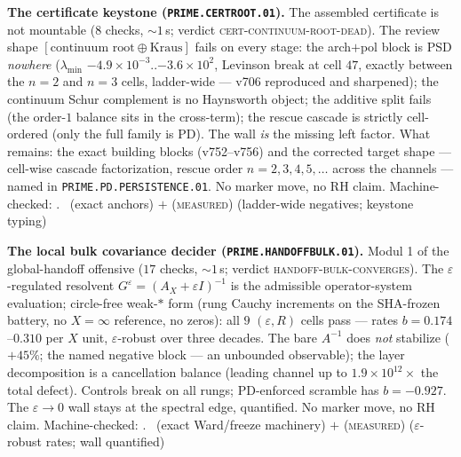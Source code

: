 \par\smallskip\noindent\textbf{The certificate keystone
(\texttt{PRIME.CERTROOT.01}).}
The assembled certificate is not mountable ($8$ checks,
${\sim}1$\,s; verdict \textsc{cert-continuum-root-dead}).  The
review shape $[\text{continuum root}\oplus\text{Kraus}]$ fails on
every stage: the arch$+$pol block is PSD \emph{nowhere}
($\lambda_{\min}$ $-4.9\times10^{-3}$..$-3.6\times10^{2}$,
Levinson break at cell $47$, exactly between the $n=2$ and $n=3$
cells, ladder-wide --- v706 reproduced and sharpened); the
continuum Schur complement is no Haynsworth object; the additive
split fails (the order-$1$ balance sits in the cross-term); the
rescue cascade is strictly cell-ordered (only the full family is
PD).  The wall \emph{is} the missing left factor.  What remains:
the exact building blocks (v752--v756) and the corrected target
shape --- cell-wise cascade factorization, rescue order
$n=2,3,4,5,\dots$ across the channels --- named in
\texttt{PRIME.PD.PERSISTENCE.01}.  No marker move, no RH claim.
Machine-checked: .
\mE\ (exact anchors) $+$ (\textsc{measured}) (ladder-wide
negatives; keystone typing)
\par\smallskip


\par\smallskip\noindent\textbf{The local bulk covariance decider
(\texttt{PRIME.HANDOFFBULK.01}).}
Modul 1 of the global-handoff offensive ($17$ checks, ${\sim}1$\,s;
verdict \textsc{handoff-bulk-converges}).  The
$\varepsilon$-regulated resolvent
$G^\varepsilon=(A_X+\varepsilon I)^{-1}$ is the admissible
operator-system evaluation; circle-free weak-$*$ form (rung Cauchy
increments on the SHA-frozen battery, no $X{=}\infty$ reference, no
zeros): all $9$ $(\varepsilon,R)$ cells pass --- rates
$b=0.174$--$0.310$ per $X$ unit, $\varepsilon$-robust over three
decades.  The bare $A^{-1}$ does \emph{not} stabilize ($+45\%$; the
named negative block --- an unbounded observable); the layer
decomposition is a cancellation balance (leading channel up to
$1.9\times10^{12}\times$ the total defect).  Controls break on all
rungs; PD-enforced scramble has $b=-0.927$.  The
$\varepsilon\to0$ wall stays at the spectral edge, quantified.  No
marker move, no RH claim.
Machine-checked: .
\mE\ (exact Ward/freeze machinery) $+$ (\textsc{measured})
($\varepsilon$-robust rates; wall quantified)
\par\smallskip


